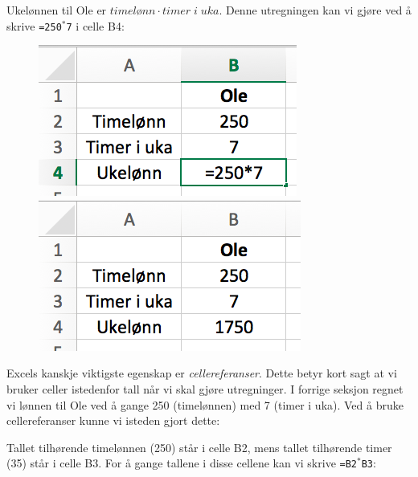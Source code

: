 Ukelønnen til Ole er $ {\textit{timelønn}\cdot timer\;i\;uka} $. Denne utregningen kan vi gjøre ved å skrive {\tt=250$ ^* $7} i celle B4:
\begin{figure}[H]
	\centering
	\includegraphics[scale=0.3]{figs/ex3}\qquad
	\includegraphics[scale=0.3]{figs/ex4}
\end{figure}
Excels kanskje viktigste egenskap er \textit{cellereferanser}. Dette betyr kort sagt at vi bruker celler istedenfor tall når vi skal gjøre utregninger. I forrige seksjon regnet vi lønnen til Ole ved å gange 250 (timelønnen) med 7 (timer i uka). Ved å bruke cellereferanser kunne vi isteden gjort dette:\vsk

Tallet tilhørende timelønnen (250) står i celle B2, mens tallet tilhørende timer (35) står i celle B3. For å gange tallene i disse cellene kan vi skrive {\tt =B2$ ^* $B3}: 

